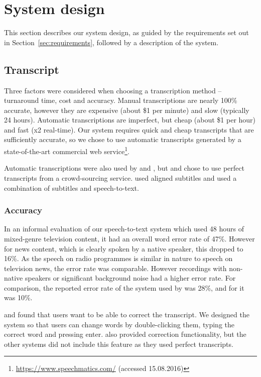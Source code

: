 \section{System design}
This section describes our system design, as guided by the requirements set out in Section~\ref{sec:requirements},
followed by a description of the system.

\subsection{Transcript}
Three factors were considered when choosing a transcription method -- turnaround time, cost and accuracy. Manual
transcriptions are nearly 100\% accurate, however they are expensive (about \$1 per minute) and slow (typically 24
hours). Automatic transcriptions are imperfect, but cheap (about \$1 per hour) and fast (x2 real-time). Our system
requires quick and cheap transcripts that are sufficiently accurate, so we chose to use automatic transcripts generated
by a state-of-the-art commercial web service\footnote{\url{https://www.speechmatics.com/} (accessed 15.08.2016)}.

Automatic transcriptions were also used by \citet{Whittaker2004} and \citet{Sivaraman2016}, but \citet{Berthouzoz2012}
and \citet{Rubin2013} chose to use perfect transcripts from a crowd-sourcing service. \citet{Hyperaudio2016} used
aligned subtitles and \citet{Casares2002} used a combination of subtitles and speech-to-text.

\subsubsection{Accuracy}\label{sec:transcript}
In an informal evaluation of our speech-to-text system which used 48 hours of mixed-genre television content, it had an
overall word error rate of 47\%.  However for news content, which is clearly spoken by a native speaker, this dropped
to 16\%. As the speech on radio programmes is similar in nature to speech on television news, the error rate was
comparable. However recordings with non-native speakers or significant background noise had a higher error rate. For
comparison, the reported error rate of the system used by
\citet{Whittaker2004} was 28\%, and for \citet{Sivaraman2016} it was 10\%.

\citet{Whittaker2004} and \citet{Sivaraman2016} found that users want to be able to correct the transcript. We designed
the system so that users can change words by double-clicking them, typing the correct word and pressing enter.
\citet{Casares2002} also provided correction functionality, but the other systems did not include this feature as they
used perfect transcripts.

